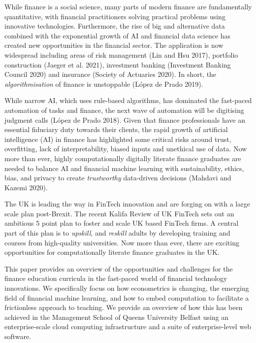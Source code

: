 \documentclass{article}
\begin{document}
While finance is a social science, many parts of modern finance are
fundamentally quantitative, with financial practitioners solving
practical problems using innovative technologies. Furthermore, the rise
of big and alternative data combined with the exponential growth of AI
and financial data science has created new opportunities in the
financial sector. The application is now widespread including areas of
risk management (Lin and Hsu 2017), portfolio construction (Jaeger et
al. 2021), investment banking (Investment Banking Council 2020) and
insurance (Society of Actuaries 2020). In short, the
\emph{algorithmisation} of finance is unstoppable (López de Prado 2019).

While narrow AI, which uses rule-based algorithms, has dominated the
fast-paced automation of tasks and finance, the next wave of automation
will be digitising judgment calls (López de Prado 2018). Given that
finance professionals have an essential fiduciary duty towards their
clients, the rapid growth of artificial intelligence (AI) in finance has
highlighted some critical risks around trust, overfitting, lack of
interpretability, biased inputs and unethical use of data. Now more than
ever, highly computationally digitally literate finance graduates are
needed to balance AI and financial machine learning with sustainability,
ethics, bias, and privacy to create \emph{trustworthy} data-driven
decisions (Mahdavi and Kazemi 2020).

The UK is leading the way in FinTech innovation and are forging on with
a large scale plan post-Brexit. The recent Kalifa Review of UK FinTech
sets out an ambitious 5 point plan to foster and scale UK based FinTech
firms. A central part of this plan is to \emph{upskill}, and
\emph{reskill} adults by developing training and courses from
high-quality universities. Now more than ever, there are exciting
opportunities for computationally literate finance graduates in the UK.

This paper provides an overview of the opportunities and challenges for
the finance education curricula in the fast-paced world of financial
technology innovations. We specifically focus on how econometrics is
changing, the emerging field of financial machine learning, and how to
embed computation to facilitate a frictionless approach to teaching. We
provide an overview of how this has been achieved in the Management
School of Queens University Belfast using an enterprise-scale cloud
computing infrastructure and a suite of enterprise-level web software.
\end{document}
